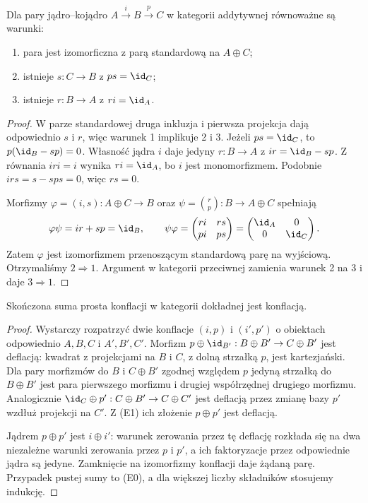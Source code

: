 \begin{stwierdzenie}\label{cat:prop:quillen-split-criterion}
Dla pary jądro--kojądro $A\xrightarrow{i}B\xrightarrow{p}C$ w kategorii addytywnej równoważne są warunki:
\begin{enumerate}
 \item para jest izomorficzna z parą standardową na $A\oplus C$;
 \item istnieje $s:C\to B$ z $ps=\id_C$;
 \item istnieje $r:B\to A$ z $ri=\id_A$.
\end{enumerate}
\end{stwierdzenie}
\begin{proof}
W parze standardowej druga inkluzja i pierwsza projekcja dają odpowiednio $s$ i $r$, więc warunek 1 implikuje 2 i 3. Jeżeli $ps=\id_C$, to $p(\id_B-sp)=0$. Własność jądra $i$ daje jedyny $r:B\to A$ z $ir=\id_B-sp$. Z równania $iri=i$ wynika $ri=\id_A$, bo $i$ jest monomorfizmem. Podobnie $irs=s-sps=0$, więc $rs=0$.

Morfizmy $\varphi=(i,s):A\oplus C\to B$ oraz $\psi=\binom r p:B\to A\oplus C$ spełniają
\[
 \varphi\psi=ir+sp=\id_B,\qquad
 \psi\varphi=
 \begin{pmatrix}ri&rs\\p i&ps\end{pmatrix}
 =\begin{pmatrix}\id_A&0\\0&\id_C\end{pmatrix}.
\]
Zatem $\varphi$ jest izomorfizmem przenoszącym standardową parę na wyjściową. Otrzymaliśmy $2\Rightarrow1$. Argument w kategorii przeciwnej zamienia warunek 2 na 3 i daje $3\Rightarrow1$.
\end{proof}

\begin{stwierdzenie}\label{cat:prop:quillen-direct-sums}
Skończona suma prosta konflacji w kategorii dokładnej jest konflacją.
\end{stwierdzenie}
\begin{proof}
Wystarczy rozpatrzyć dwie konflacje $(i,p)$ i $(i',p')$ o obiektach odpowiednio $A,B,C$ i $A',B',C'$. Morfizm $p\oplus\id_{B'}:B\oplus B'\to C\oplus B'$ jest deflacją: kwadrat z projekcjami na $B$ i $C$, z dolną strzałką $p$, jest kartezjański. Dla pary morfizmów do $B$ i $C\oplus B'$ zgodnej względem $p$ jedyną strzałką do $B\oplus B'$ jest para pierwszego morfizmu i drugiej współrzędnej drugiego morfizmu. Analogicznie $\id_C\oplus p':C\oplus B'\to C\oplus C'$ jest deflacją przez zmianę bazy $p'$ wzdłuż projekcji na $C'$. Z (E1) ich złożenie $p\oplus p'$ jest deflacją.

Jądrem $p\oplus p'$ jest $i\oplus i'$: warunek zerowania przez tę deflację rozkłada się na dwa niezależne warunki zerowania przez $p$ i $p'$, a ich faktoryzacje przez odpowiednie jądra są jedyne. Zamknięcie na izomorfizmy konflacji daje żądaną parę. Przypadek pustej sumy to (E0), a dla większej liczby składników stosujemy indukcję.
\end{proof}


